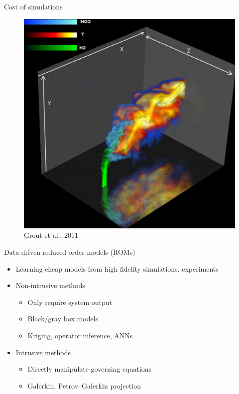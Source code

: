 \documentclass[]{beamer}
\begin{document}
\begin{frame}{Cost of simulations}
\begin{minipage}{0.3\linewidth}
\begin{figure}
		\end{figure}
	\end{minipage}
	\hspace{1cm}
	\centering
	\begin{minipage}{0.3\linewidth}
		\centering
		\begin{figure}
			\centering
			\includegraphics[width=0.95\linewidth]{intro/jetCrossflowDNS.png}
			\caption*{\tiny{Grout et al., 2011}}
		\end{figure}
	\end{minipage}
	
\end{frame}

\begin{frame}{Data-driven reduced-order models (ROMs)}
	\begin{itemize}
		\item Learning cheap models from high fidelity simulations, experiments
		\item Non-intrusive methods
		\begin{itemize}
			\item Only require system output
			\item Black/gray box models
			\item Kriging, operator inference, ANNs
		\end{itemize}
		\item Intrusive methods
		\begin{itemize}
			\item Directly manipulate governing equations
			\item Galerkin, Petrov--Galerkin projection
		\end{itemize}
	\end{itemize}
\end{frame}
\end{document}
